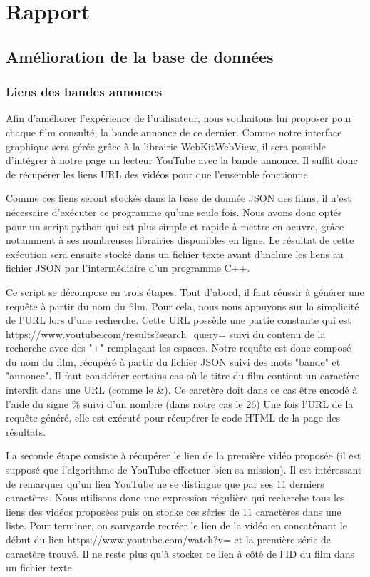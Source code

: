 \documentclass{report}
\begin{document}
\chapter{Rapport}

\section{Amélioration de la base de données}

\subsection{Liens des bandes annonces}
Afin d'améliorer l'expérience de l'utilisateur, nous souhaitons lui proposer pour chaque film consulté, la bande annonce de ce dernier.
Comme notre interface graphique sera gérée grâce à la librairie WebKitWebView, il sera possible d'intégrer à notre page un lecteur YouTube avec la bande annonce.
Il suffit donc de récupérer les liens URL des vidéos pour que l'ensemble fonctionne.\par
Comme ces liens seront stockés dans la base de donnée JSON des films, il n'est nécessaire d'exécuter ce programme qu'une seule fois. Nous avons donc optés pour un script python qui est plus simple et rapide à mettre en oeuvre, grâce notamment à ses nombreuses librairies disponibles en ligne. Le résultat de cette exécution sera ensuite stocké dans un fichier texte avant d'inclure les liens au fichier JSON par l'intermédiaire d'un programme C++.\par
\vspace{1cm}
Ce script se décompose en trois étapes.
  Tout d'abord, il faut réussir à générer une requête à partir du nom du film. Pour cela, nous nous appuyons sur la simplicité de l'URL lors d'une recherche. Cette URL possède une partie constante qui est https://www.youtube.com/results?search\_query=  suivi du contenu de la recherche avec des "+" remplaçant les espaces.
Notre requête est donc composé du nom du film, récupéré à partir du fichier JSON suivi des mots "bande" et "annonce". Il faut considérer certains cas où le titre du film contient un caractère interdit dans une URL (comme le \&). Ce carctère doit dans ce cas être encodé à l'aide du signe \% suivi d'un nombre (dans notre cas le 26)
Une fois l'URL de la requête généré, elle est exécuté pour récupérer le code HTML de la page des résultats.\par
La seconde étape consiste à récupérer le lien de la première vidéo proposée (il est supposé que l'algorithme de YouTube effectuer bien sa mission). Il est intéressant de remarquer qu'un lien YouTube ne se distingue que par ses 11 derniers caractères. Nous utilisons donc une expression régulière qui recherche tous les liens des vidéos proposées puis on stocke ces séries de 11 caractères dans une liste.
Pour terminer, on sauvgarde recréer le lien de la vidéo en concaténant le début du lien https://www.youtube.com/watch?v= et la première série de caractère trouvé. Il ne reste plus qu'à stocker ce lien à côté de l'ID du film dans un fichier texte.
\end{document}
